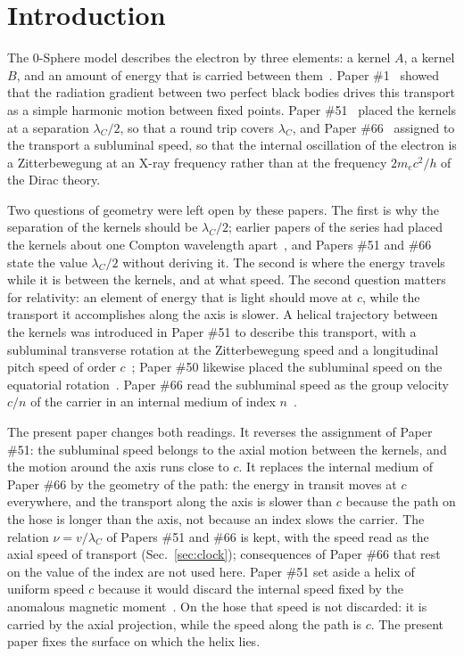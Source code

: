 \documentclass[%
 reprint, amsmath,amssymb, aps, prb, ]{revtex4-2}
\numberwithin{equation}{section}
\newcommand{\lamC}{\lambda_C}
\begin{document}
\maketitle

\section{Introduction}

The 0-Sphere model describes the electron by three elements: a kernel $A$, a kernel $B$, and an amount of energy that is carried between them~\cite{H01,H66}. Paper \#1~\cite{H01} showed that the radiation gradient between two perfect black bodies drives this transport as a simple harmonic motion between fixed points. Paper \#51~\cite{H51} placed the kernels at a separation $\lamC/2$, so that a round trip covers $\lamC$, and Paper \#66~\cite{H66} assigned to the transport a subluminal speed, so that the internal oscillation of the electron is a Zitterbewegung at an X-ray frequency rather than at the frequency $2m_ec^2/h$ of the Dirac theory.

Two questions of geometry were left open by these papers. The first is why the separation of the kernels should be $\lamC/2$; earlier papers of the series had placed the kernels about one Compton wavelength apart~\cite{H01,H10,H65}, and Papers \#51 and \#66 state the value $\lamC/2$ without deriving it. The second is where the energy travels while it is between the kernels, and at what speed. The second question matters for relativity: an element of energy that is light should move at $c$, while the transport it accomplishes along the axis is slower. A helical trajectory between the kernels was introduced in Paper \#51 to describe this transport, with a subluminal transverse rotation at the Zitterbewegung speed and a longitudinal pitch speed of order $c$~\cite{H51}; Paper \#50 likewise placed the subluminal speed on the equatorial rotation~\cite{H50}. Paper \#66 read the subluminal speed as the group velocity $c/n$ of the carrier in an internal medium of index $n$~\cite{H66}.

The present paper changes both readings. It reverses the assignment of Paper \#51: the subluminal speed belongs to the axial motion between the kernels, and the motion around the axis runs close to $c$. It replaces the internal medium of Paper \#66 by the geometry of the path: the energy in transit moves at $c$ everywhere, and the transport along the axis is slower than $c$ because the path on the hose is longer than the axis, not because an index slows the carrier. The relation $\nu = v/\lamC$ of Papers \#51 and \#66 is kept, with the speed read as the axial speed of transport (Sec.~\ref{sec:clock}); consequences of Paper \#66 that rest on the value of the index are not used here. Paper \#51 set aside a helix of uniform speed $c$ because it would discard the internal speed fixed by the anomalous magnetic moment~\cite{H51}. On the hose that speed is not discarded: it is carried by the axial projection, while the speed along the path is $c$. The present paper fixes the surface on which the helix lies.
\end{document}
